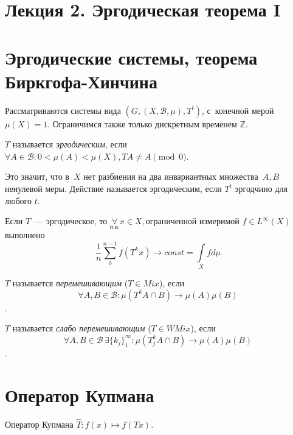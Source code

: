 \documentclass{article}
\begin{document}
\section*{Лекция 2. Эргодическая теорема I}
\resetcntrs

\section{Эргодические системы, теорема Биркгофа-Хинчина}

Рассматриваются системы вида $(G, (X, \mathcal{B}, \mu), T^t)$, с~конечной
мерой~$\mu(X) = 1$. Ограничимся также только дискретным временем $\mathbb{Z}$.

\begin{definition}
	$T$ называется \emph{эргодическим}, если $\forall A \in \mathcal{B}:
	0 < \mu(A) < \mu(X), TA \ne A \pmod 0$.
\end{definition}

Это значит, что в~$X$ нет разбиения на два инвариантных множества~$A, B$
ненулевой меры. Действие называется эргодическим, если $T^t$ эргодчино для
любого $t$.

\begin{theorem}
	Если $T$~--- эргодическое, то $\underset{\text{п.н.}}{\forall} x \in X,
	\text{ограниченной измеримой } f \in L^\infty(X)$ выполнено
	$$\frac{1}{n} \sum\limits_0^{n-1} f(T^kx) \rightarrow const = \int\limits_X f
	d\mu$$
\end{theorem}

\begin{definition}
	$T$ называется \emph{перемешивающим} ($T \in Mix$), если $$\forall A, B \in
	\mathcal{B}: \mu(T^k A \cap B) \rightarrow \mu(A)\mu(B)$$.
\end{definition}

\begin{definition}
	$T$ называется \emph{слабо перемешивающим} ($T \in WMix$), если $$\forall A, B
	\in \mathcal{B}\,\exists \{k_j\}_1^\infty : \mu(T^k_j A \cap B) \rightarrow
	\mu(A)\mu(B)$$.
\end{definition}

\section{Оператор Купмана}

\begin{definition}
	Оператор Купмана $\hat T: f(x) \mapsto f(Tx)$.
\end{definition}
\end{document}
